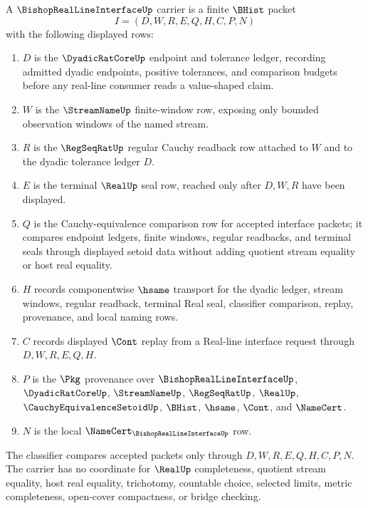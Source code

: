 \begin{definition}
\label{def:bishop-real-line-interface-carrier}
A $\BishopRealLineInterfaceUp$ carrier is a finite $\BHist$ packet
$$
I=(D,W,R,E,Q,H,C,P,N)
$$
with the following displayed rows:
\begin{enumerate}
\item $D$ is the $\DyadicRatCoreUp$ endpoint and tolerance ledger, recording admitted dyadic endpoints, positive tolerances, and comparison budgets before any real-line consumer reads a value-shaped claim.
\item $W$ is the $\StreamNameUp$ finite-window row, exposing only bounded observation windows of the named stream.
\item $R$ is the $\RegSeqRatUp$ regular Cauchy readback row attached to $W$ and to the dyadic tolerance ledger $D$.
\item $E$ is the terminal $\RealUp$ seal row, reached only after $D,W,R$ have been displayed.
\item $Q$ is the Cauchy-equivalence comparison row for accepted interface packets; it compares endpoint ledgers, finite windows, regular readbacks, and terminal seals through displayed setoid data without adding quotient stream equality or host real equality.
\item $H$ records componentwise $\hsame$ transport for the dyadic ledger, stream windows, regular readback, terminal Real seal, classifier comparison, replay, provenance, and local naming rows.
\item $C$ records displayed $\Cont$ replay from a Real-line interface request through $D,W,R,E,Q,H$.
\item $P$ is the $\Pkg$ provenance over $\BishopRealLineInterfaceUp$, $\DyadicRatCoreUp$, $\StreamNameUp$, $\RegSeqRatUp$, $\RealUp$, $\CauchyEquivalenceSetoidUp$, $\BHist$, $\hsame$, $\Cont$, and $\NameCert$.
\item $N$ is the local $\NameCert_{\BishopRealLineInterfaceUp}$ row.
\end{enumerate}
The classifier compares accepted packets only through $D,W,R,E,Q,H,C,P,N$. The carrier has no coordinate for $\RealUp$ completeness, quotient stream equality, host real equality, trichotomy, countable choice, selected limits, metric completeness, open-cover compactness, or bridge checking.
\end{definition}

